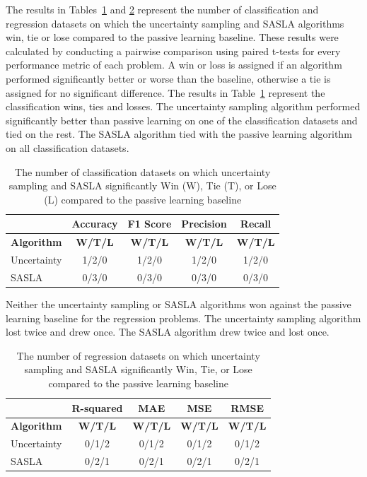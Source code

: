 \documentclass[conference]{IEEEtran}
\begin{document}
	The results in Tables~\ref{tab:classification_wtl} and \ref{tab:regression_wtl} represent the number of classification and regression datasets on which the uncertainty sampling and SASLA algorithms win, tie or lose compared to the passive learning baseline. These results were calculated by conducting a pairwise comparison using paired t-tests for every performance metric of each problem. A win or loss is assigned if an algorithm performed significantly better or worse than the baseline, otherwise a tie is assigned for no significant difference. The results in Table~\ref{tab:classification_wtl} represent the classification wins, ties and losses. The uncertainty sampling algorithm performed significantly better than passive learning on one of the classification datasets and tied on the rest. The SASLA algorithm tied with the passive learning algorithm on all classification datasets.
	
	\begin{table}[htbp]
		\centering
		\caption{The number of classification datasets on which uncertainty sampling and SASLA significantly Win (W), Tie (T), or Lose (L) compared to the passive learning baseline}
		\label{tab:classification_wtl}
		\begin{tabular}{lcccc}
			\hline
			& \textbf{Accuracy} & \textbf{F1 Score} & \textbf{Precision} & \textbf{Recall} \\
			\hline
			\textbf{Algorithm} & \textbf{W/T/L} & \textbf{W/T/L} &\textbf{W/T/L} & \textbf{W/T/L} \\
			\hline
			Uncertainty & 1/2/0 & 1/2/0 & 1/2/0 & 1/2/0 \\
			SASLA       & 0/3/0 & 0/3/0 & 0/3/0 & 0/3/0 \\
			\hline
		\end{tabular}
	\end{table}
	
	Neither the uncertainty sampling or SASLA algorithms won against the passive learning baseline for the regression problems. The uncertainty sampling algorithm lost twice and drew once. The SASLA algorithm drew twice and lost once. 
	
	\begin{table}[htbp]
		\centering
		\caption{The number of regression datasets on which uncertainty sampling and SASLA significantly Win, Tie, or Lose compared to the passive learning baseline}
		\label{tab:regression_wtl}
		\begin{tabular}{lcccc}
			\hline
			& \textbf{R-squared} & \textbf{MAE} & \textbf{MSE} & \textbf{RMSE} \\
			\hline
			\textbf{Algorithm} & \textbf{W/T/L} & \textbf{W/T/L} &\textbf{W/T/L} & \textbf{W/T/L} \\
			\hline
			Uncertainty & 0/1/2 & 0/1/2 & 0/1/2 & 0/1/2 \\
			SASLA       & 0/2/1 & 0/2/1 & 0/2/1 & 0/2/1 \\
			\hline
		\end{tabular}
	\end{table}
	
\end{document}
